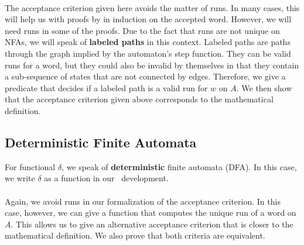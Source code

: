 
\paragraph{}
The acceptance criterion given here avoids the matter of runs.
In many cases, this will help us with proofs by in induction on the accepted word.
However, we will need runs in some of the proofs.
Due to the fact that runs are not unique on NFAs, 
we will speak of \textbf{labeled paths} in this context.
Labeled paths are paths through the graph implied by the automaton's step function.
They can be valid runs for a word, but they could also be invalid by themselves 
in that they contain a sub-sequence of states that are not connected by edges.
Therefore, we give a predicate that decides if a labeled path is a valid run for $w$ on $A$.
We then show that the acceptance criterion given above corresponds to the mathematical definition.


\subsection{Deterministic Finite Automata}
For functional $\delta$, we speak of \textbf{deterministic} finite automata (DFA). 
In this case, we write $\delta$ as a function in our \coq\ development. 


\paragraph{}
Again, we avoid runs in our formalization of the acceptance criterion.
In this case, however, we can give a function that computes the unique run of a word on $A$.
This allows us to give an alternative acceptance criterion that is closer to the mathematical definition.
We also prove that both criteria are equivalent.



